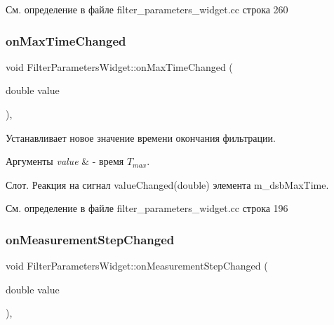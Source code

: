 См. определение в файле filter\+\_\+parameters\+\_\+widget.\+cc строка 260

\hypertarget{class_filter_parameters_widget_a80199438a8dededc61f17d7acd0e2487}{}\label{class_filter_parameters_widget_a80199438a8dededc61f17d7acd0e2487} 
\subsubsection{\texorpdfstring{on\+Max\+Time\+Changed}{onMaxTimeChanged}}
{\footnotesize\ttfamily void Filter\+Parameters\+Widget\+::on\+Max\+Time\+Changed (\begin{DoxyParamCaption}\item[{double}]{value }\end{DoxyParamCaption})\hspace{0.3cm}{\ttfamily [private]}, {\ttfamily [slot]}}



Устанавливает новое значение времени окончания фильтрации. 


\begin{DoxyParams}{Аргументы}
{\em value} & -\/ время $T_{max}$.\\
\hline
\end{DoxyParams}
Слот. Реакция на сигнал value\+Changed(double) элемента m\+\_\+dsb\+Max\+Time. 

См. определение в файле filter\+\_\+parameters\+\_\+widget.\+cc строка 196

\hypertarget{class_filter_parameters_widget_afdabd842b69fd6a4b65b4d44a5c81c55}{}\label{class_filter_parameters_widget_afdabd842b69fd6a4b65b4d44a5c81c55} 
\subsubsection{\texorpdfstring{on\+Measurement\+Step\+Changed}{onMeasurementStepChanged}}
{\footnotesize\ttfamily void Filter\+Parameters\+Widget\+::on\+Measurement\+Step\+Changed (\begin{DoxyParamCaption}\item[{double}]{value }\end{DoxyParamCaption})\hspace{0.3cm}{\ttfamily [private]}, {\ttfamily [slot]}}




